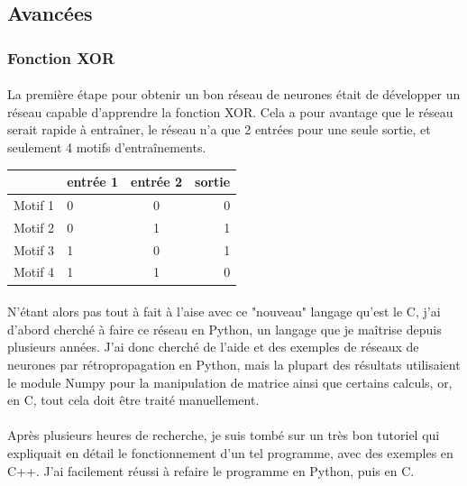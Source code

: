 \documentclass{article}
\begin{document}
\subsection{Avancées}

\subsubsection{Fonction XOR}

\paragraph{} La première étape pour obtenir un bon réseau de neurones était de développer un réseau capable d'apprendre la fonction XOR. Cela a pour avantage que le réseau serait rapide à entraîner, le réseau n'a que 2 entrées pour une seule sortie, et seulement 4 motifs d'entraînements.

\begin{center}
\vspace*{0.2cm}
\begin{tabular}{|l|l|c|r|}
  \hline
  & entrée 1 & entrée 2 & sortie \\
  \hline
  Motif 1 & 0 & 0 & 0 \\
  Motif 2 & 0 & 1 & 1 \\
  Motif 3 & 1 & 0 & 1 \\
  Motif 4 & 1 & 1 & 0 \\
  \hline
\end{tabular}
\end{center}


\paragraph{}N'étant alors pas tout à fait à l'aise avec ce "nouveau" langage qu'est le C, j'ai d'abord cherché à faire ce réseau en Python, un langage que je maîtrise depuis plusieurs années. J'ai donc cherché de l'aide et des exemples de réseaux de neurones par rétropropagation en Python, mais la plupart des résultats utilisaient le module Numpy pour la manipulation de matrice ainsi que certains calculs, or, en C, tout cela doit être traité manuellement.

\paragraph{}Après plusieurs heures de recherche, je suis tombé sur un très bon tutoriel qui expliquait en détail le fonctionnement d'un tel programme, avec des exemples en C++. J'ai facilement réussi à refaire le programme en Python, puis en C.
\end{document}

